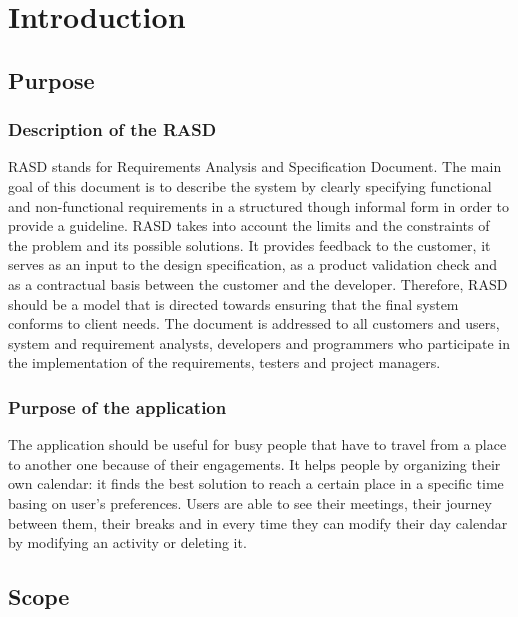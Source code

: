 \documentclass[12pt,titlepage]{article}
\begin{document}
\tableofcontents

\pagebreak

\section{Introduction} \label{introduzione}

\subsection{Purpose} \label{sec:purpose}

\medskip
\subsubsection{Description of the RASD}\label{RASD}
RASD stands for Requirements Analysis and Specification Document.
The main goal of this document is to describe the system by clearly specifying functional and non-functional requirements in a structured though informal form in order to provide a guideline.
RASD takes into account the limits and the constraints of the problem and its possible solutions. 
It provides feedback to the customer, it serves as an input to the design specification, as a product validation check and as a contractual basis between the customer and the developer.
Therefore, RASD should be a model that is directed towards ensuring that the final system conforms to client needs.
The document is addressed to all customers and users, system and requirement analysts, developers and programmers who participate in the implementation of the requirements, testers and project managers.

\subsubsection{Purpose of the application}\label{RASD}
The application should be useful for busy people that have to travel from a place to another one because of their engagements. It helps people by organizing their own calendar: it finds the best solution to reach a certain place in a specific time basing on user's preferences. 
Users are able to see their meetings, their journey between them, their breaks and in every time they can modify their day calendar by modifying an activity or deleting it.

\subsection{Scope}\label{RASD}
\end{document}
